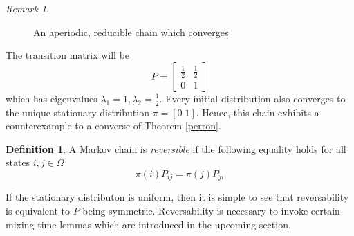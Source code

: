 \documentclass[12pt]{amsart}
\theoremstyle{definition}
\newtheorem{definition}[theorem]{Definition}
\theoremstyle{remark}
\newtheorem{remark}[theorem]{Remark}
\numberwithin{equation}{section}
\theoremstyle{remark}
\begin{document}
\begin{remark}
\begin{figure}[h!]
    \caption{An aperiodic, reducible chain which converges}
  \end{figure}
  \noindent The transition matrix will be $$ P = \left[ \begin{matrix} \frac{1}{2} & \frac{1}{2} \\
  0 & 1 \end{matrix} \right]$$ which has eigenvalues $\lambda_1 = 1, \lambda_2 = \frac{1}{2}$. Every initial distribution also converges to the unique stationary distribution $\pi = [0 \; 1]$. Hence, this chain exhibits a counterexample to a converse of Theorem \ref{perron}.
\end{remark}
%
%
%
\begin{definition}
A Markov chain is \emph{reversible} if the following equality holds for all states $i,j \in \Omega$
\begin{equation}
  \pi(i)P_{ij} = \pi(j)P_{ji}
\end{equation}
\end{definition}
\noindent If the stationary distributon is uniform, then it is simple to see that reversability is equivalent to $P$ being symmetric. Reversability is necessary to invoke certain mixing time lemmas which are introduced in the upcoming section.
\end{document}
